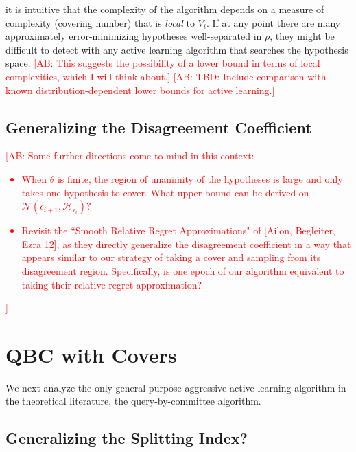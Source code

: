 \documentclass{article}[12pt]
\newcommand{\authcmt}[2]{\ifnum\Comments=1\textcolor{#1}{#2}\fi}
\newcommand{\akshay}[1]{\authcmt{red}      {[AB: #1]}}
\theoremstyle{named}
\newcommand{\cH}{\mathcal{H}}
\newcommand{\cN}{\mathcal{N}}
\begin{document}
it is intuitive that the complexity of the algorithm depends on a measure of complexity (covering number) 
that is \emph{local} to $V_i$. 
If at any point there are many approximately error-minimizing hypotheses well-separated in $\rho$, 
they might be difficult to detect with any active learning algorithm that searches the hypothesis space.
\akshay{This suggests the possibility of a lower bound in terms of local complexities, 
which I will think about.}
\akshay{TBD: Include comparison with known distribution-dependent lower bounds for active learning.}












\newpage
\subsection{Generalizing the Disagreement Coefficient}

\akshay{Some further directions come to mind in this context: 
\begin{itemize}
\item
When $\theta$ is finite, the region of unanimity of the hypotheses is large and only takes one hypothesis to cover. 
What upper bound can be derived on $\cN(\epsilon_{i+1}, \cH_{\epsilon_i})$?
\item
Revisit the ``Smooth Relative Regret Approximations" of [Ailon, Begleiter, Ezra 12], 
as they directly generalize the disagreement coefficient in a way that appears similar 
to our strategy of taking a cover and sampling from its disagreement region. 
Specifically, is one epoch of our algorithm equivalent to taking their relative regret approximation?
\end{itemize}}





\newpage
\section{QBC with Covers}
We next analyze the only general-purpose aggressive active learning algorithm in the theoretical literature, 
the query-by-committee algorithm. 


\subsection{Generalizing the Splitting Index?}
\end{document}
